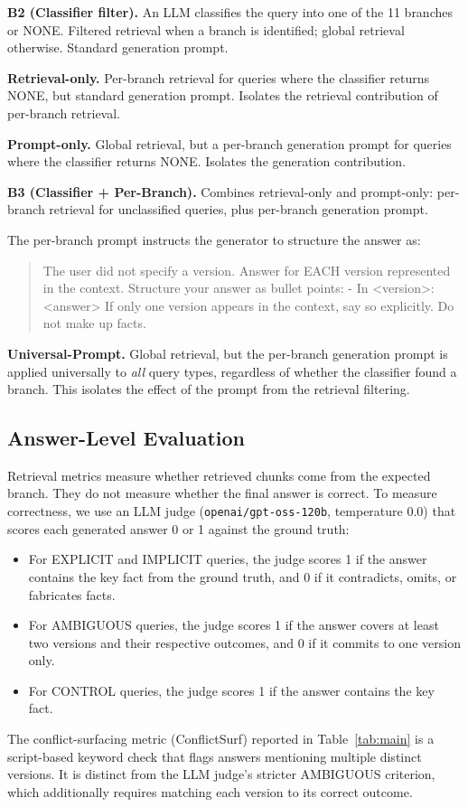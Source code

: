 \documentclass[conference]{IEEEtran}
\begin{document}
\textbf{B2 (Classifier filter).} An LLM classifies the query into one of the 11 branches or NONE. Filtered retrieval when a branch is identified; global retrieval otherwise. Standard generation prompt.

\textbf{Retrieval-only.} Per-branch retrieval for queries where the classifier returns NONE, but standard generation prompt. Isolates the retrieval contribution of per-branch retrieval.

\textbf{Prompt-only.} Global retrieval, but a per-branch generation prompt for queries where the classifier returns NONE. Isolates the generation contribution.

\textbf{B3 (Classifier + Per-Branch).} Combines retrieval-only and prompt-only: per-branch retrieval for unclassified queries, plus per-branch generation prompt.

The per-branch prompt instructs the generator to structure the answer as:
\begin{quote}
\small\ttfamily
The user did not specify a version. Answer for EACH version represented
in the context. Structure your answer as bullet points:
- In <version>: <answer>
If only one version appears in the context, say so explicitly.
Do not make up facts.
\end{quote}

\textbf{Universal-Prompt.} Global retrieval, but the per-branch generation prompt is applied universally to \emph{all} query types, regardless of whether the classifier found a branch. This isolates the effect of the prompt from the retrieval filtering.

\subsection{Answer-Level Evaluation}
\label{sec:judge}
Retrieval metrics measure whether retrieved chunks come from the expected branch. They do not measure whether the final answer is correct. To measure correctness, we use an LLM judge (\texttt{openai/gpt-oss-120b}, temperature 0.0) that scores each generated answer 0 or 1 against the ground truth:
\begin{itemize}
\item For EXPLICIT and IMPLICIT queries, the judge scores 1 if the answer contains the key fact from the ground truth, and 0 if it contradicts, omits, or fabricates facts.
\item For AMBIGUOUS queries, the judge scores 1 if the answer covers at least two versions and their respective outcomes, and 0 if it commits to one version only.
\item For CONTROL queries, the judge scores 1 if the answer contains the key fact.
\end{itemize}
The conflict-surfacing metric (ConflictSurf) reported in Table~\ref{tab:main} is a script-based keyword check that flags answers mentioning multiple distinct versions. It is distinct from the LLM judge's stricter AMBIGUOUS criterion, which additionally requires matching each version to its correct outcome.
\end{document}
